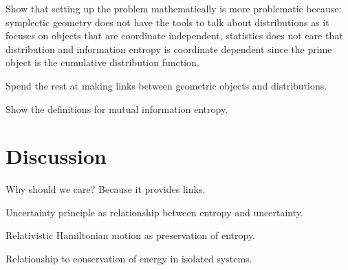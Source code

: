\documentclass[aps,pra,10pt,twocolumn,floatfix,nofootinbib]{revtex4-1}
\begin{document}
Show that setting up the problem mathematically is more problematic because: symplectic geometry does not have the tools to talk about distributions as it focuses on objects that are coordinate independent, statistics does not care that distribution and information entropy is coordinate dependent since the prime object is the cumulative distribution function.

Spend the rest at making links between geometric objects and distributions.

Show the definitions for mutual information entropy.

\section{Discussion}

Why should we care? Because it provides links.

Uncertainty principle as relationship between entropy and uncertainty.

Relativistic Hamiltonian motion as preservation of entropy.

Relationship to conservation of energy in isolated systems.

\begin{thebibliography}{0}
	
\end{thebibliography}
\end{document}

